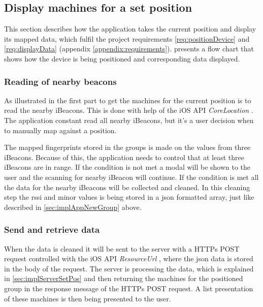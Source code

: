 \subsection{Display machines for a set position}\label{sec:implAppSetPos}
This section describes how the application takes the current position and display its mapped data, which fulfil the project requirements \ref{req:positionDevice} and \ref{req:displayData} (appendix \ref{appendix:requirements}).
 presents a flow chart that shows how the device is being positioned and corresponding data displayed.



\subsubsection{Reading of nearby beacons}\label{sec:implAppSetPosReadBeacons}
As illustrated in  the first part to get the machines for the current position is to read the nearby iBeacons.
This is done with help of the iOS API \textit{CoreLocation} \cite{CoreLocationApple}.
The application constant read all nearby iBeacons, but it's a user decision when to manually map against a position.

\bigskip

The mapped fingerprints stored in the groups is made on the values from three iBeacons.
Because of this, the application needs to control that at least three iBeacons are in range.
If the condition is not met a modal will be shown to the user and the scanning for nearby iBeacon will continue.
If the condition is met all the data for the nearby iBeacons will be collected and cleaned.
In this cleaning step the \acrshort{rssi} and minor values is being stored in a \acrshort{json} formatted array, just like  described in \cref{sec:implAppNewGroup} above.


\subsubsection{Send and retrieve data}\label{sec:implAppSetPosSendRetreiveData}
When the data is cleaned it will be sent to the server with a HTTPs POST request controlled with the iOS API \textit{ResourceUrl} \cite{ResourceURLAppleDeveloper}, where the \acrshort{json} data is stored in the body of the request.
The server is processing the data, which is explained in \cref{sec:implServerSetPos} and then returning the machines for the positioned group in the response message of the HTTPs POST request.
A list presentation of these machines is then being presented to the user.


